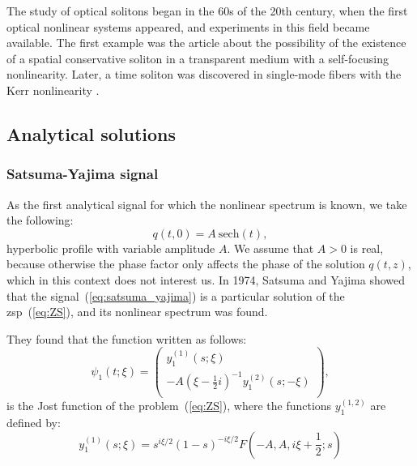 The study of optical solitons began in the 60s of the 20th century, when the first optical nonlinear systems appeared, and experiments in this field became available. The first example was the article \cite{askaryan1962en} about the possibility of the existence of a spatial conservative soliton in a transparent medium with a self-focusing nonlinearity. Later, a time soliton was discovered in single-mode fibers with the Kerr nonlinearity \cite{hasegawa1973}.


\subsection{Analytical solutions}
\subsubsection{Satsuma-Yajima signal}

As the first analytical signal for which the nonlinear spectrum is known, we take the following:
\begin{equation}
    q(t, 0) = A \ \mathrm{sech}(t) {,}
    \label{eq:satsuma_yajima}
\end{equation}
hyperbolic profile with variable amplitude $ A $. We assume that $ A> 0 $ is real, because otherwise the phase factor only affects the phase of the solution $q (t, z)$, which in this context does not interest us. In 1974, Satsuma and Yajima showed that the signal~(\ref{eq:satsuma_yajima}) is a particular solution of the \acrfull{zsp}~(\ref{eq:ZS}), and its nonlinear spectrum was found.

They found that the function written as follows:
\begin{equation}
    \psi_1(t; \xi) =
    \begin{pmatrix}
        y_1^{(1)}(s; \xi) \\
        -A(\xi - \frac{1}{2}i)^{-1} y_1^{(2)}(s; -\xi) \\
    \end{pmatrix} {,}
\end{equation}
is the Jost function of the problem~(\ref{eq:ZS}), where the functions $ y_1^{(1,2)} $ are defined by:
\begin{equation}
    y_1^{(1)} (s; \xi) = s^{i\xi/2}(1 - s)^{-i\xi/2} F \left(-A, A, i\xi + \frac{1}{2}; s\right)
\end{equation}

